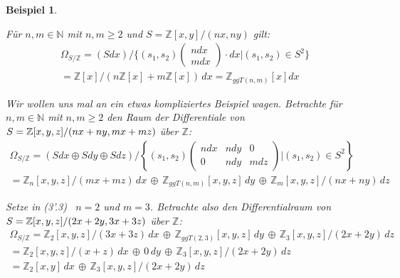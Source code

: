 \documentclass[10pt,a4paper]{report}
\newcounter{Aussage}[chapter]
\newtheorem{bsp}[Aussage]{Beispiel}
\newcommand{\divR}[2]{\Omega_{#1/#2}}
\begin{document}
\begin{bsp}
\begin{itemize}
{\item[(3'.2)] Für $n,m \in \mathbb{N}$ mit $n,m \geq 2$ und $S = \mathbb{Z}[x,y]/(nx,ny)$ gilt:
\begin{gather*}
\divR{S}{\mathbb{Z}}
= (S dx)/\lbrace (s_1,s_2)
\begin{pmatrix}
ndx\\
mdx
\end{pmatrix}
 \cdot dx \vert (s_1,s_2) \in S^2 \rbrace \\
= \mathbb{Z}[x]/ \left(n\mathbb{Z}[x] + m\mathbb{Z}[x]\right) \, dx 
= \mathbb{Z}_{ggT(n,m)}[x]dx
\end{gather*}

\item[(3'.3)] Wir wollen uns mal an ein etwas kompliziertes Beispiel wagen. Betrachte für $n,m \in \mathbb{N}$ mit $n,m \geq 2$ den Raum der Differentiale von \\$S = \nolinebreak{\mathbb{Z}[x,y,z]/(nx + ny, mx + mz)}$ über $\mathbb{Z}$:
\begin{gather*}
\divR{S}{\mathbb{Z}}
= (Sdx \oplus Sdy \oplus Sdz)/\left\lbrace (s_1,s_2) 
\begin{pmatrix}
ndx & ndy & 0\\
0   & ndy & mdz
\end{pmatrix}
\vert (s_1,s_2) \in S^2 \right\rbrace\\
=\mathbb{Z}_n[x,y,z]/(mx + mz) \, dx \, \oplus \, \mathbb{Z}_{ggT(n,m)}[x,y,z] \, dy \, \oplus \, \mathbb{Z}_m[x,y,z]/(nx + ny) \, dz
\end{gather*}

\item[(3'.4)] Setze in \textit{(3'.3)} \, $n = 2$ und $m = 3$. Betrachte also den Differentialraum von \\
$\nolinebreak{S = \mathbb{Z}[x,y,z]/(2x + 2y, 3x + 3z)}$ über $\mathbb{Z}$:
\begin{gather*}
\divR{S}{\mathbb{Z}}
=\mathbb{Z}_2[x,y,z]/(3x + 3z) \, dx \, \oplus \, \mathbb{Z}_{ggT(2,3)}[x,y,z] \, dy \, \oplus \, \mathbb{Z}_3[x,y,z]/(2x + 2y) \, dz \\
= \mathbb{Z}_2[x,y,z]/(x + z) \, dx \, \oplus \, 0 \, dy \, \oplus \, \mathbb{Z}_3[x,y,z]/(2x + 2y) \, dz\\
= \mathbb{Z}_2[x,y] \, dx \, \oplus \, \mathbb{Z}_3[x,y,z]/(2x + 2y) \, dz
\end{gather*}
}
\end{itemize}
\end{bsp}
\end{document}
